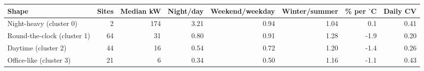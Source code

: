 \begin{tabular}{lrrrrrrr}
\toprule
Shape & Sites & Median kW & Night/day & Weekend/weekday & Winter/summer & \% per $^\circ$C & Daily CV \\
\midrule
Night-heavy (cluster 0) & 2 & 174 & 3.21 & 0.94 & 1.04 & 0.1 & 0.41 \\
Round-the-clock (cluster 1) & 64 & 31 & 0.80 & 0.91 & 1.28 & -1.9 & 0.20 \\
Daytime (cluster 2) & 44 & 16 & 0.54 & 0.72 & 1.20 & -1.4 & 0.26 \\
Office-like (cluster 3) & 21 & 6 & 0.34 & 0.50 & 1.16 & -1.1 & 0.43 \\
\bottomrule
\end{tabular}
